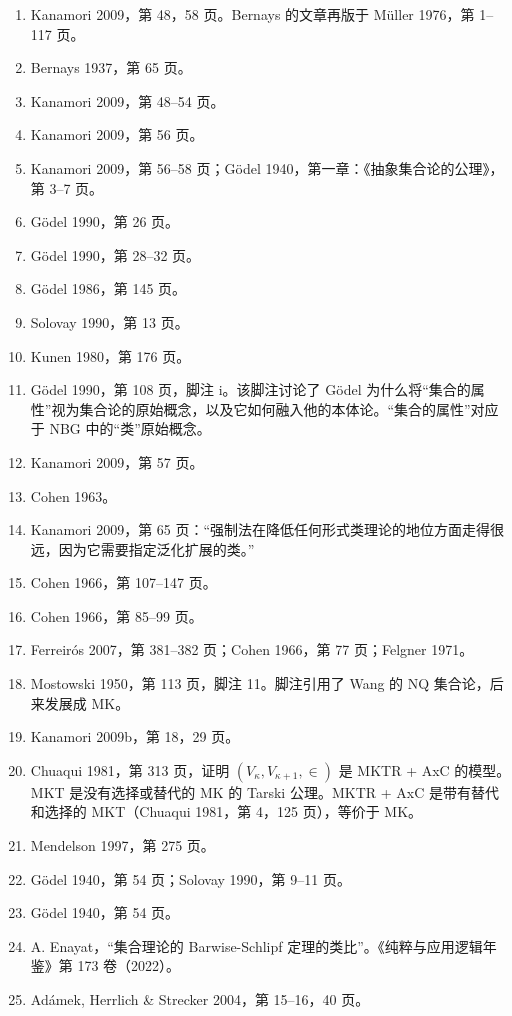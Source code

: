 \begin{enumerate}
\item Kanamori 2009，第 48，58 页。Bernays 的文章再版于 Müller 1976，第 1–117 页。  
\item Bernays 1937，第 65 页。  
\item Kanamori 2009，第 48–54 页。  
\item Kanamori 2009，第 56 页。  
\item Kanamori 2009，第 56–58 页；Gödel 1940，第一章：《抽象集合论的公理》，第 3–7 页。  
\item Gödel 1990，第 26 页。  
\item Gödel 1990，第 28–32 页。  
\item Gödel 1986，第 145 页。  
\item Solovay 1990，第 13 页。  
\item Kunen 1980，第 176 页。  
\item Gödel 1990，第 108 页，脚注 i。该脚注讨论了 Gödel 为什么将“集合的属性”视为集合论的原始概念，以及它如何融入他的本体论。“集合的属性”对应于 NBG 中的“类”原始概念。  
\item Kanamori 2009，第 57 页。  
\item Cohen 1963。  
\item Kanamori 2009，第 65 页：“强制法在降低任何形式类理论的地位方面走得很远，因为它需要指定泛化扩展的类。”  
\item Cohen 1966，第 107–147 页。  
\item Cohen 1966，第 85–99 页。  
\item Ferreirós 2007，第 381–382 页；Cohen 1966，第 77 页；Felgner 1971。  
\item Mostowski 1950，第 113 页，脚注 11。脚注引用了 Wang 的 NQ 集合论，后来发展成 MK。  
\item Kanamori 2009b，第 18，29 页。  
\item Chuaqui 1981，第 313 页，证明 \((V_\kappa, V_{\kappa+1}, \in)\) 是 MKTR + AxC 的模型。MKT 是没有选择或替代的 MK 的 Tarski 公理。MKTR + AxC 是带有替代和选择的 MKT（Chuaqui 1981，第 4，125 页），等价于 MK。  
\item Mendelson 1997，第 275 页。  
\item Gödel 1940，第 54 页；Solovay 1990，第 9–11 页。  
\item Gödel 1940，第 54 页。  
\item A. Enayat，“集合理论的 Barwise-Schlipf 定理的类比”。《纯粹与应用逻辑年鉴》第 173 卷（2022）。  
\item Adámek, Herrlich & Strecker 2004，第 15–16，40 页。
\end{enumerate}

